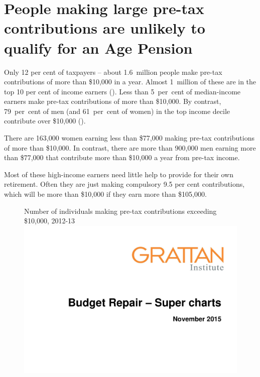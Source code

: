 \section{People making large pre-tax contributions are unlikely to qualify for an Age Pension}
Only 12 per cent of taxpayers – about 1.6~million people make pre-tax contributions of more than \$10,000 in a year. Almost 1~million of these are in the top 10 per cent of income earners (). Less than 5~per~cent of median-income earners make pre-tax contributions of more than \$10,000. By contrast, 79~per~cent of men (and 61~per~cent of women) in the top income decile contribute over \$10,000 (). 

There are 163,000 women earning less than \$77,000 making pre-tax contributions of more than \$10,000. In contrast, there are more than 900,000 men earning more than \$77,000 that contribute more than \$10,000 a year from pre-tax income.

Most of these high-income earners need little help to provide for their own retirement. Often they are just making compulsory 9.5 per cent contributions, which will be more than \$10,000 if they earn more than \$105,000.

\begin{figure}
%
{Number of individuals making pre-tax contributions exceeding \$10,000, 2012-13}\label{fig:SUPER-4-6}
\includegraphics[width=\columnwidth,page=24]{super-atlas/PPTX.pdf}

\end{figure}

